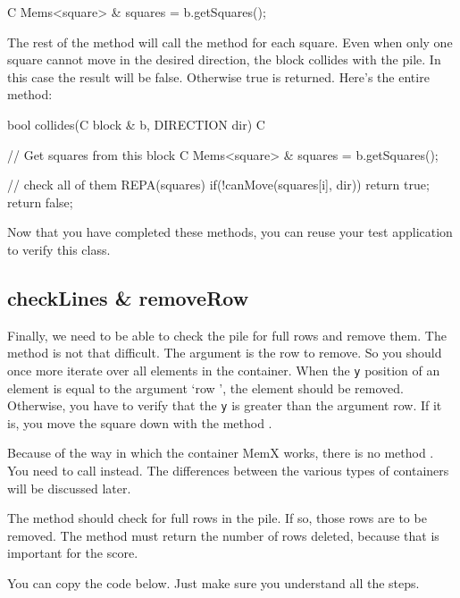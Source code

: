 \begin{code}
C Mems<square> & squares = b.getSquares();
\end{code}

The rest of the method will call the method  for each square. Even when only one square cannot move in the desired direction, the block collides with the pile. In this case the result will be false. Otherwise true is returned. Here's the entire method:

\begin{code}
bool collides(C block & b, DIRECTION dir) C
{
	// Get squares from this block
	C Mems<square> & squares = b.getSquares();
	
	// check all of them
	REPA(squares)
{
		 if(!canMove(squares[i], dir))
 {
				return true;
 }
}
	return false;
}
\end{code}

Now that you have completed these methods, you can reuse your test application to verify this class.

\subsection{checkLines \& removeRow}
Finally, we need to be able to check the pile for full rows and remove them. The method  is not that difficult. The argument is the row to remove. So you should once more iterate over all elements in the container. When the \verb|y| position of an element is equal to the argument `row ', the element should be removed. Otherwise, you have to verify that the \verb|y| is greater than the argument row. If it is, you move the square down with the method .

\begin{note}
Because of the way in which the container MemX works, there is no method . You need to call  instead. The differences between the various types of containers will be discussed later. 
\end{note}

The method  should check for full rows in the pile. If so, those rows are to be removed. The method must return the number of rows deleted, because that is important for the score.

You can copy the code below. Just make sure you understand all the steps.

